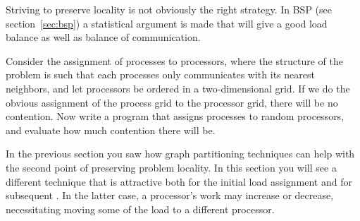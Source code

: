 Striving to preserve locality is not obviously the right strategy. In
\ac{BSP} (see section~\ref{sec:bsp}) a statistical argument is made
that  will give a good load balance as
well as balance of communication.

\begin{exercise}
  Consider the assignment of processes to processors, where the
  structure of the problem is such that 
  each processes only communicates with its
  nearest neighbors, and let processors be ordered in a
  two-dimensional grid. If we do the obvious assignment of the process
  grid to the processor grid, there will be no contention. Now write a
  program that assigns processes to random processors, and evaluate
  how much contention there will be.
\end{exercise}

In the previous section you saw how graph partitioning techniques can
help with the second point of preserving problem locality. In this
section you will see a different technique that is attractive both for
the initial load assignment and for subsequent
. In the latter case, a processor's
work may increase or decrease, necessitating moving some of the load
to a different processor.

